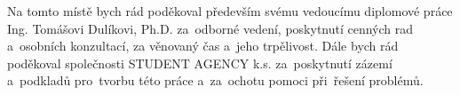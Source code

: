 \documentclass[a4paper,12pt]{article}
\begin{document}
\titulnistrana

\zadani

\prohlaseni

\abstraktaklicovaslova


\clearpage
\thispagestyle{empty}
Na tomto místě bych rád poděkoval především svému vedoucímu diplomové práce Ing. Tomášovi Dulíkovi, Ph.D. za~odborné vedení, poskytnutí cenných rad a~osobních konzultací, za  věnovaný čas a~jeho trpělivost. Dále bych rád poděkoval společnosti STUDENT AGENCY k.s. za~poskytnutí zázemí a~podkladů pro~tvorbu této práce a~za~ochotu pomoci při~řešení problémů.   

\obsah  %


\OdsazovaniOdstavcuStart %


\OdsazovaniOdstavcuStop
\end{document}
